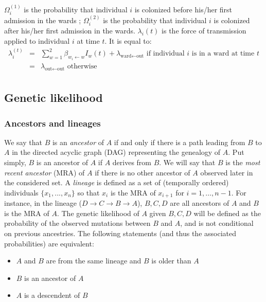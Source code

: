 \documentclass[10pt]{article}
\begin{document}
$\Omega_i^{\left(1\right)}$ is the probability that individual $i$ is colonized before his/her first admission in the wards ; $\Omega_i^{\left(2\right)}$ is the probability that individual $i$ is colonized after his/her first admission in the wards. 
$\lambda_i\left(t\right)$ is the force of transmission applied to individual $i$ at time $t$. It is equal to: 
\begin{eqnarray*}
\lambda_i^{\left(t\right)} & = & \sum_{w=1}^{2} \beta_{w_i \leftarrow w} I_w\left(t\right) + \lambda_{\text{ward} \leftarrow \text{out}} \text{ if individual $i$ is in a ward at time $t$}  \\
 & = & \lambda_{\text{out} \leftarrow \text{out}} \text{ otherwise}\\
\end{eqnarray*}


\subsection*{Genetic likelihood}


\subsubsection*{Ancestors and lineages}
\noindent We say that $B$ is an \textit{ancestor} of $A$ if and only if there is a path leading from $B$ to $A$ in the directed acyclic graph (DAG) representing the genealogy of $A$.
Put simply, $B$ is an ancestor of $A$ if $A$ derives from $B$.
We will say that $B$ is the \textit{most recent ancestor} (MRA) of $A$ if there is no other ancestor of $A$ observed later in the considered set.
A \textit{lineage} is defined as a set of (temporally ordered) individuals $\{x_1, ..., x_n\}$ so that $x_i$ is the MRA of $x_{i+1}$ for $i=1,\ldots,n-1$.
For instance, in the lineage ($D \rightarrow C \rightarrow B \rightarrow A$), $B,C,D$ are all ancestors of $A$ and $B$ is the MRA of $A$.
The genetic likelihood of $A$ given $B,C,D$ will be defined as the probability of the observed mutations between $B$ and $A$, and is not conditional on previous ancestries.
The following statements (and thus the associated probabilities) are equivalent:
\begin{itemize}
 \item $A$ and $B$ are from the same lineage and $B$ is older than $A$
 \item $B$ is an ancestor of $A$
 \item $A$ is a descendent of $B$
\end{itemize}
\end{document}
